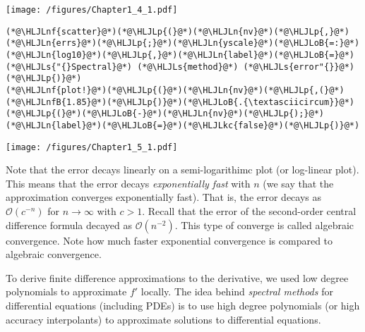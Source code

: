 \documentclass[12pt,a4paper]{article}
\newcommand{\HLJLkc}[1]{\textcolor[RGB]{59,151,46}{\textit{#1}}}
\newcommand{\HLJLn}[1]{#1}
\newcommand{\HLJLnf}[1]{\textcolor[RGB]{66,102,213}{#1}}
\newcommand{\HLJLs}[1]{\textcolor[RGB]{201,61,57}{#1}}
\newcommand{\HLJLnfB}[1]{\textcolor[RGB]{59,151,46}{#1}}
\newcommand{\HLJLoB}[1]{\textcolor[RGB]{102,102,102}{\textbf{#1}}}
\newcommand{\HLJLp}[1]{#1}
\begin{document}
\texttt{[image: /figures/Chapter1\_4\_1.pdf]}

\begin{lstlisting}
(*@\HLJLnf{scatter}@*)(*@\HLJLp{(}@*)(*@\HLJLn{nv}@*)(*@\HLJLp{,}@*)(*@\HLJLn{errs}@*)(*@\HLJLp{;}@*)(*@\HLJLn{yscale}@*)(*@\HLJLoB{=:}@*)(*@\HLJLn{log10}@*)(*@\HLJLp{,}@*)(*@\HLJLn{label}@*)(*@\HLJLoB{=}@*)(*@\HLJLs{"{}Spectral}@*) (*@\HLJLs{method}@*) (*@\HLJLs{error"{}}@*)(*@\HLJLp{)}@*)
(*@\HLJLnf{plot!}@*)(*@\HLJLp{(}@*)(*@\HLJLn{nv}@*)(*@\HLJLp{,(}@*)(*@\HLJLnfB{1.85}@*)(*@\HLJLp{)}@*)(*@\HLJLoB{.{\textasciicircum}}@*)(*@\HLJLp{(}@*)(*@\HLJLoB{-}@*)(*@\HLJLn{nv}@*)(*@\HLJLp{);}@*)(*@\HLJLn{label}@*)(*@\HLJLoB{=}@*)(*@\HLJLkc{false}@*)(*@\HLJLp{)}@*)
\end{lstlisting}

\texttt{[image: /figures/Chapter1\_5\_1.pdf]}

Note that the error decays linearly on a semi-logarithimc plot (or log-linear plot).  This means that the error decays \emph{exponentially fast} with $n$ (we say that the approximation converges exponentially fast).  That is, the error decays as $\mathcal{O}(c^{-n})$ for $n \to \infty$ with $c > 1$.  Recall that the error of the second-order central difference formula decayed as $\mathcal{O}(n^{-2})$.  This type of converge is  called algebraic convergence.  Note how much faster exponential convergence is compared to algebraic convergence.

To derive finite difference approximations to the derivative, we used low degree polynomials to approximate $f'$ locally.  The idea behind \emph{spectral methods} for differential equations (including PDEs) is to use high degree polynomials (or high accuracy interpolants) to approximate solutions to differential equations.
\end{document}
